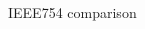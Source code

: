 \begin{frame}{IEEE754 comparison}
\begin{columns}
\begin{column}{0.5\textwidth}


\end{column}
\end{columns}
\end{frame}
